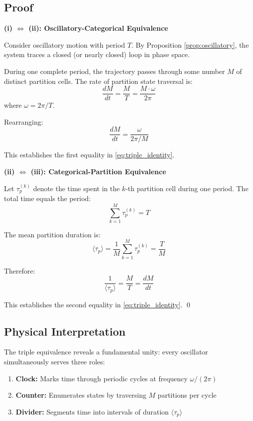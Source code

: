 \subsection{Proof}

\textbf{(i) $\Leftrightarrow$ (ii): Oscillatory-Categorical Equivalence}

Consider oscillatory motion with period $T$. By Proposition \ref{prop:oscillatory}, the system traces a closed (or nearly closed) loop in phase space.

During one complete period, the trajectory passes through some number $M$ of distinct partition cells. The rate of partition state traversal is:
\begin{equation}
\frac{dM}{dt} = \frac{M}{T} = \frac{M \cdot \omega}{2\pi}
\end{equation}
where $\omega = 2\pi/T$.

Rearranging:
\begin{equation}
\frac{dM}{dt} = \frac{\omega}{2\pi/M}
\end{equation}

This establishes the first equality in \eqref{eq:triple_identity}.

\textbf{(ii) $\Leftrightarrow$ (iii): Categorical-Partition Equivalence}

Let $\tau_p^{(k)}$ denote the time spent in the $k$-th partition cell during one period. The total time equals the period:
\begin{equation}
\sum_{k=1}^{M} \tau_p^{(k)} = T
\end{equation}

The mean partition duration is:
\begin{equation}
\langle\tau_p\rangle = \frac{1}{M} \sum_{k=1}^{M} \tau_p^{(k)} = \frac{T}{M}
\end{equation}

Therefore:
\begin{equation}
\frac{1}{\langle\tau_p\rangle} = \frac{M}{T} = \frac{dM}{dt}
\end{equation}

This establishes the second equality in \eqref{eq:triple_identity}. \qed

\subsection{Physical Interpretation}

The triple equivalence reveals a fundamental unity: every oscillator simultaneously serves three roles:
\begin{enumerate}
    \item \textbf{Clock:} Marks time through periodic cycles at frequency $\omega/(2\pi)$
    \item \textbf{Counter:} Enumerates states by traversing $M$ partitions per cycle
    \item \textbf{Divider:} Segments time into intervals of duration $\langle\tau_p\rangle$
\end{enumerate}

